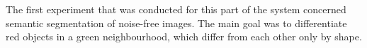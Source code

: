 The first experiment that was conducted for this part of the system concerned semantic segmentation of noise-free images. The main goal was to differentiate red objects in a green neighbourhood, which differ from each other only by shape.